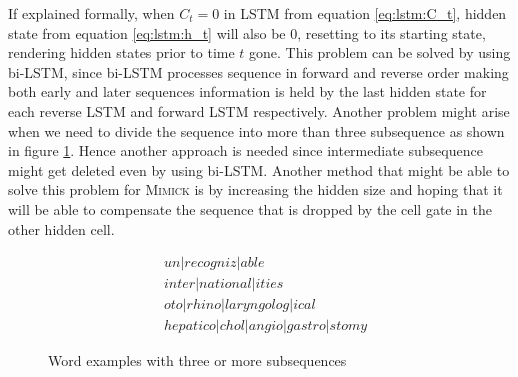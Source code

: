         If explained formally, when $C_t = 0$ in LSTM from equation
        \ref{eq:lstm:C_t}, hidden state from equation
        \ref{eq:lstm:h_t} will also be $0$, resetting to its starting
        state, rendering hidden states prior to time $t$ gone. This
        problem can be solved by using bi-LSTM, since bi-LSTM
        processes sequence in forward and reverse order making both
        early and later sequences information is held by the last
        hidden state for each reverse LSTM and forward LSTM
        respectively. Another problem might arise when we need to
        divide the sequence into more than three subsequence as shown in
        figure \ref{fig:subsequence}. Hence another approach is needed
        since intermediate subsequence might get deleted even by using
        bi-LSTM. Another method that might be able to solve this
        problem for \textsc{Mimick} is by increasing the hidden size and
        hoping that it will be able to compensate the sequence that is
        dropped by the cell gate in the other hidden cell.
        \begin{figure}
            \begin{align*}
                &un \vert recogniz \vert able \\
                &inter \vert national \vert ities \\
                &oto \vert rhino \vert laryngolog \vert ical \\
                &hepatico \vert chol \vert angio \vert gastro \vert stomy
            \end{align*}
            \caption{Word examples with three or more subsequences}
            \label{fig:subsequence}
        \end{figure}

